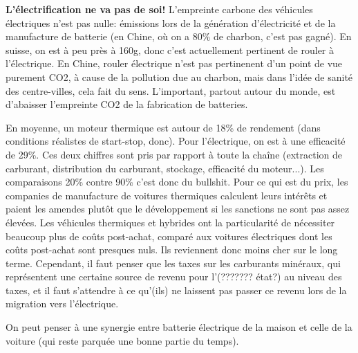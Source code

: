 \documentclass{article}
\begin{document}
\textbf{L'électrification ne va pas de soi!} L'empreinte carbone des véhicules électriques n'est pas nulle: émissions lors de la génération d'électricité et de la manufacture de batterie (en Chine, où on a 80\% de charbon, c'est pas gagné). En suisse, on est à peu près à 160g, donc c'est actuellement pertinent de rouler à l'électrique. En Chine, rouler électrique n'est pas pertinenent d'un point de vue purement CO2, à cause de la pollution due au charbon, mais dans l'idée de sanité des centre-villes, cela fait du sens. L'important, partout autour du monde, est d'abaisser l'empreinte CO2 de la fabrication de batteries. \par
 En moyenne, un moteur thermique est autour de 18\% de rendement (dans conditions réalistes de start-stop, donc). Pour l'électrique, on est à une efficacité de 29\%. Ces deux chiffres sont pris par rapport à toute la chaîne (extraction de carburant, distribution du carburant, stockage, efficacité du moteur...). Les comparaisons 20\% contre 90\% c'est donc du bullshit. Pour ce qui est du prix, les companies de manufacture de voitures thermiques calculent leurs intérêts et paient les amendes plutôt que le développement si les sanctions ne sont pas assez élevées. Les véhicules thermiques et hybrides ont la particularité de nécessiter beaucoup plus de coûts post-achat, comparé aux voitures électriques dont les coûts post-achat sont presques nuls. Ils reviennent donc moins cher sur le long terme. Cependant, il faut penser que les taxes sur les carburants minéraux, qui représentent une certaine source de revenu pour l'(??????? état?) au niveau des taxes, et il faut s'attendre à ce qu'(ils) ne laissent pas passer ce revenu lors de la migration vers l'électrique. \par
 On peut penser à une synergie entre batterie électrique de la maison et celle de la voiture (qui reste parquée une bonne partie du temps).
\end{document}
